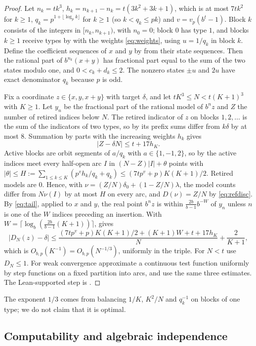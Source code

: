\documentclass[11pt]{article}
\begin{document}
\begin{proof}
Let $n_k=tk^3$, $h_k=n_{k+1}-n_k=t(3k^2+3k+1)$, which is at most $7tk^2$ for $k\ge1$,
$q_k=p^{1+\lfloor\log_pk\rfloor}$ for $k\ge1$ (so $k<q_k\le pk$) and $v=v_p(b^t-1)$. Block $k$ consists of the integers in $[n_k,n_{k+1})$, with
$n_0=0$; block $0$ has type $1$, and blocks $k\ge1$ receive types by  with the
weights \eqref{eq:weights}, using $u=1/q_k$ in block $k$. Define the coefficient sequences of $x$ and $y$
by  from their state sequences. Then the rational part of $b^{n_k}(x+y)$ has
fractional part equal to the sum of the two states modulo one, and $0<c_k+d_k\le2$. The nonzero states
$\pm u$ and $2u$ have exact denominator $q_k$ because $p$ is odd.

Fix a coordinate $z\in\{x,y,x+y\}$ with target $\delta$, and let $tK^3\le N<t(K+1)^3$ with $K\ge1$. Let
$y_n$ be the fractional part of the rational model of $b^nz$ and $Z$ the number of retired indices below
$N$. The retired indicator of $z$ on blocks $1,2,\ldots$ is the sum of the indicators of two types, so by
 its prefix sums differ from $k\delta$ by at most $8$. Summation by parts with the
increasing weights $h_k$ gives
\[
|Z-\delta N|\le t+17h_K .
\]
Active blocks are orbit segments of $a/q_k$ with $a\in\{1,-1,2\}$, so by  the active
indices meet every half-open arc $I$ in $(N-Z)|I|+\theta$ points with
$|\theta|\le H:=\sum_{1\le k\le K}(p^vh_k/q_k+q_k)\le(7tp^v+p)K(K+1)/2$. Retired models are $0$. Hence, with
$\nu=(Z/N)\delta_0+(1-Z/N)\lambda$, the model counts differ from $N\nu(I)$ by at most $H$ on every arc,
and $D(\nu)=Z/N$ by \eqref{eq:refdisc}. By \eqref{eq:tail}, applied to $x$ and $y$, the real point
$b^nz$ is within $\frac{2b}{b-1}b^{-W}$ of $y_n$ unless $n$ is one of the $W$ indices preceding an insertion.
With $W=\lceil\log_b(\frac{2b}{b-1}(K+1))\rceil$,  gives
\[
|D_N(z)-\delta|\le\frac{(7tp^v+p)K(K+1)/2+(K+1)W+t+17h_K}{N}+\frac2{K+1},
\]
which is $O_{b,p}(K^{-1})=O_{b,p}(N^{-1/3})$, uniformly in the triple. For $N<t$ use $D_N\le1$. For weak
convergence approximate a continuous test function uniformly by step functions on a fixed partition
into arcs, and use the same three estimates. The Lean-supported step is .
\end{proof}

The exponent $1/3$ comes from balancing $1/K$, $K^2/N$ and $q_k^{-1}$ on blocks of one type; we do not
claim that it is optimal.

\subsection{Computability and algebraic independence}
\end{document}

